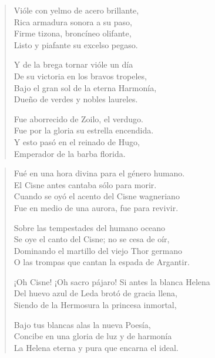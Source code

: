 \documentclass[12pt]{article}
\begin{document}
\begin{verse}
Vióle con yelmo de acero brillante,\\
Rica armadura sonora a su paso,\\
Firme tizona, broncíneo olifante,\\
Listo y piafante su excelso pegaso.  

Y de la brega tornar vióle un día\\
De su victoria en los bravos tropeles,\\
Bajo el gran sol de la eterna Harmonía,\\
Dueño de verdes y nobles laureles.  

Fue aborrecido de Zoilo, el verdugo.\\
Fue por la gloria su estrella encendida.\\
Y esto pasó en el reinado de Hugo,\\
Emperador de la barba florida.  

\end{verse}

\clearpage
{}
\begin{verse}

Fué en una hora divina para el género humano.\\
El Cisne antes cantaba sólo para morir.\\
Cuando se oyó el acento del Cisne wagneriano\\
Fue en medio de una aurora, fue para revivir.  

Sobre las tempestades del humano oceano\\
Se oye el canto del Cisne; no se cesa de oír,\\
Dominando el martillo del viejo Thor germano\\
O las trompas que cantan la espada de Argantir.  

¡Oh Cisne! ¡Oh sacro pájaro! Si antes la blanca Helena\\
Del huevo azul de Leda brotó de gracia llena,\\
Siendo de la Hermosura la princesa inmortal,  

Bajo tus blancas alas la nueva Poesía,\\
Concibe en una gloria de luz y de harmonía\\
La Helena eterna y pura que encarna el ideal.  

\end{verse}
\end{document}
